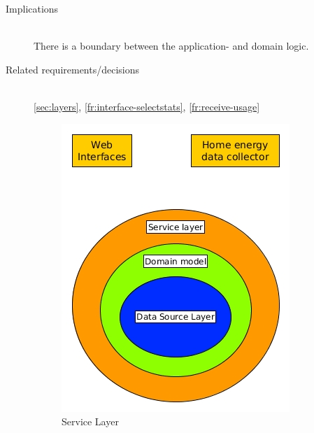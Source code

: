 \begin{description}
\item [Implications]~\\
There is a boundary between the application- and domain logic.

\item [Related requirements/decisions]~\\
\ref{sec:layers}, \ref{fr:interface-selectstats}, \ref{fr:receive-usage}

\begin{figure}[H]
\caption{Service Layer}
\centering
\includegraphics[scale=0.7]{4-analysis/images/ServiceLayer.jpg}
\end{figure}


\end{description}


%
%
%
%
%

